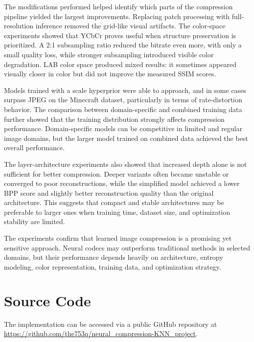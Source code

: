 \documentclass[conference]{IEEEtran}
\begin{document}
The modifications performed helped identify which parts of the compression pipeline yielded the largest improvements. Replacing patch processing with full-resolution inference removed the grid-like visual artifacts. The color-space experiments showed that YCbCr proves useful when structure preservation is prioritized. A 2:1 subsampling ratio reduced the bitrate even more, with only a small quality loss, while stronger subsampling introduced visible color degradation. LAB color space produced mixed results: it sometimes appeared visually closer in color but did not improve the measured SSIM scores.

Models trained with a scale hyperprior were able to approach, and in some cases surpass JPEG on the Minecraft dataset, particularly in terms of rate-distortion behavior. The comparison between domain-specific and combined training data further showed that the training distribution strongly affects compression performance. Domain-specific models can be competitive in limited and regular image domains, but the larger model trained on combined data achieved the best overall performance.

The layer-architecture experiments also showed that increased depth alone is not sufficient for better compression. Deeper variants often became unstable or converged to poor reconstructions, while the simplified model achieved a lower BPP score and slightly better reconstruction quality than the original architecture. This suggests that compact and stable architectures may be preferable to larger ones when training time, dataset size, and optimization stability are limited.

The experiments confirm that learned image compression is a promising yet sensitive approach. Neural codecs may outperform traditional methods in selected domains, but their performance depends heavily on architecture, entropy modeling, color representation, training data, and optimization strategy.

\section*{Source Code}
The implementation can be accessed via a public GitHub repository at
\url{https://github.com/the753q/neural_compression-KNN_project}.

\twocolumn[
\begin{@twocolumnfalse}
    
    
\end{@twocolumnfalse}
]
\end{document}
